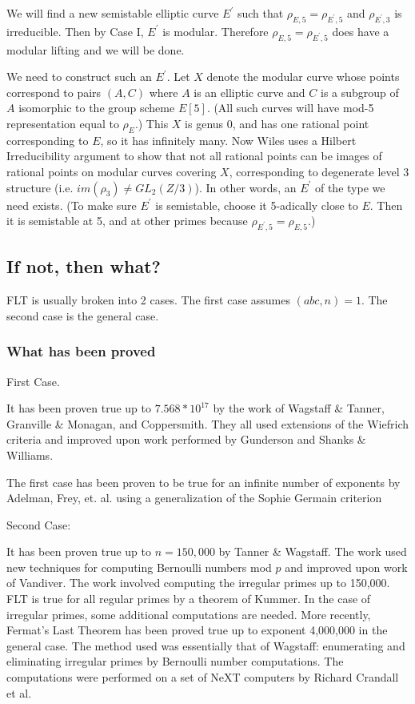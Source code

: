 {\begin{itemize}
    We will find a new semistable elliptic curve $E^\prime$ such that
    $\rho_{E,5} = \rho_{E^\prime,5}$ and $\rho_{E^\prime,3}$ is
    irreducible.  Then by Case I, $E^\prime$ is modular.  Therefore
    $\rho_{E,5}= \rho_{E^\prime,5}$ does have a modular lifting and we
    will be done.

    We need to construct such an $E^\prime$.  Let $X$ denote the modular
    curve whose points correspond to pairs $(A, C)$ where $A$ is an
    elliptic curve and $C$ is a subgroup of $A$ isomorphic to the group
    scheme $E[5]$.  (All such curves will have mod-5 representation
    equal to $\rho_E$.)  This $X$ is genus 0, and has one rational point
    corresponding to $E$, so it has infinitely many.  Now Wiles uses a
    Hilbert Irreducibility argument to show that not all rational points
    can be images of rational points on modular curves covering $X$,
    corresponding to degenerate level 3 structure (i.e. $im(\rho_3) \neq
    GL_2(Z/3)$).  In other words, an $E^\prime$ of the type we need
    exists.  (To make sure $E^\prime$ is semistable, choose it
    5-adically close to $E$.  Then it is semistable at 5, and at other
    primes because $\rho_{E^\prime,5} = \rho_{E,5}$.)
  \end{itemize}

  \subsection{If not, then what?}

  FLT is usually broken into 2 cases. The first case assumes $(abc,n) =
  1$. The second case is the general case.

  \subsubsection{What has been proved}


  First Case.

  It has been proven true up to $7.568*10^{17}$ by the work of Wagstaff
  \& Tanner, Granville \& Monagan, and Coppersmith. They all used
  extensions of the Wiefrich criteria and improved upon work performed
  by Gunderson and Shanks \& Williams.

  The first case has been proven to be true for an infinite number of
  exponents by Adelman, Frey, et. al. using a generalization of the
  Sophie Germain criterion


  \noindent Second Case:

  It has been proven true up to $n = 150,000$ by Tanner \& Wagstaff. The
  work used new techniques for computing Bernoulli numbers mod $p$ and
  improved upon work of Vandiver. The work involved computing the
  irregular primes up to 150,000. FLT is true for all regular primes by
  a theorem of Kummer. In the case of irregular primes, some additional
  computations are needed. More recently, Fermat's Last Theorem has been
  proved true up to exponent 4,000,000 in the general case. The method
  used was essentially that of Wagstaff: enumerating and eliminating
  irregular primes by Bernoulli number computations. The computations
  were performed on a set of NeXT computers by Richard Crandall et al.

}
